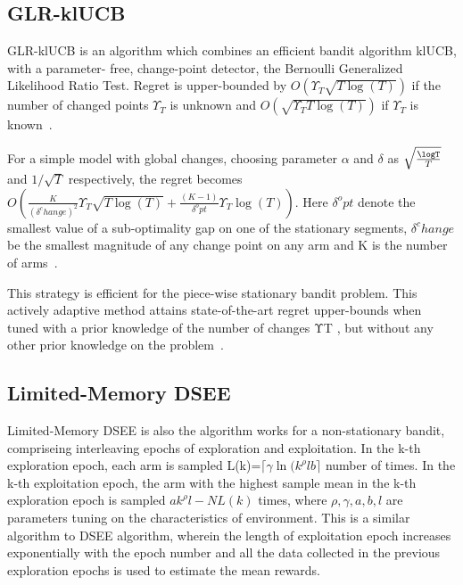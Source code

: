 \subsection{GLR-klUCB}\label{subsec:glr-klucb}
GLR-klUCB is an algorithm which combines an efficient bandit algorithm klUCB, with a parameter- free, change-point detector, the Bernoulli Generalized Likelihood Ratio Test.
Regret is upper-bounded by $ O\left(\Upsilon_T \sqrt{T \log\left(T\right)} \right)$ if the number of changed points $\Upsilon_T $ is unknown and $ O\left(\sqrt{\Upsilon_T T \log\left(T\right)} \right)$ if  $\Upsilon_T $ is known~\citep{Besson2019}.
\par
For a simple model with global changes, choosing parameter $\alpha$ and $\delta $ as $\sqrt{\frac{\logT}{T}}$ and $1/\sqrt{T}$ respectively, the regret becomes $O\left(\frac{K}{\left(\delta^change\right)^2} \Upsilon_T \sqrt{T \log\left(T\right)}+\frac{\left(K-1\right)}{\delta^opt} \Upsilon_T \log\left(T\right)\right)$.
Here $\delta^opt$ denote the smallest value of a sub-optimality gap on one of the stationary segments, $\delta^change$ be the smallest magnitude of any change point on any arm and K is the number of arms~\citep{Besson2019}.
\par
This strategy is efficient for the piece-wise stationary bandit problem.
This actively adaptive method attains state-of-the-art regret upper-bounds when tuned with a prior knowledge of the number of changes ΥT , but without any other prior knowledge on the problem~\citep{Besson2019}.

\subsection{Limited-Memory DSEE} %
Limited-Memory DSEE is also the algorithm works for a non-stationary bandit, compriseing interleaving epochs of exploration and exploitation. In the k-th exploration epoch, each arm is sampled L(k)=$\lceil\gamma\ln({k^{\rho}lb}\rceil$ number of times. In the k-th exploitation epoch, the arm with the highest sample mean in the k-th exploration epoch is sampled $ak^{\rho}l-NL(k)$ times, where $\rho, \gamma,a,b,l$ are parameters tuning on the characteristics of environment.
\newline This is a similar algorithm to DSEE algorithm, wherein the length of exploitation epoch increases exponentially with the epoch number and all the data collected in the previous exploration epochs is used to estimate the mean rewards.

